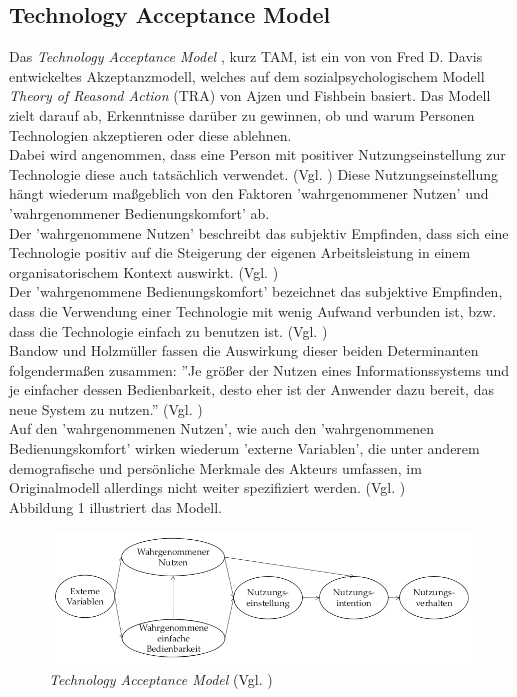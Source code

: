 \documentclass[deutsch]{lib/llncs/llncs}
\begin{document}
\subsection{Technology Acceptance Model}
Das \textit{Technology Acceptance Model} \cite{Zitat01}, kurz TAM, ist ein von von Fred D. Davis entwickeltes Akzeptanzmodell, welches auf dem sozialpsychologischem Modell \textit{Theory of Reasond Action} (TRA) von Ajzen und Fishbein \cite{Zitat04} basiert. Das Modell zielt darauf ab, Erkenntnisse darüber zu gewinnen, ob und warum Personen Technologien akzeptieren oder diese ablehnen. \\
Dabei wird angenommen, dass eine Person mit positiver Nutzungseinstellung zur Technologie diese auch tatsächlich verwendet. (Vgl. \cite[S. 237]{Zitat03}) Diese Nutzungseinstellung hängt wiederum maßgeblich von den Faktoren 'wahrgenommener Nutzen' und 'wahrgenommener Bedienungskomfort' ab. \\
Der 'wahrgenommene Nutzen' beschreibt das subjektiv Empfinden, dass sich eine Technologie positiv auf die Steigerung der eigenen Arbeitsleistung in einem organisatorischem Kontext auswirkt.  (Vgl. \cite[S. 320]{Zitat02}) \\
Der 'wahrgenommene Bedienungskomfort' bezeichnet das subjektive Empfinden, dass die Verwendung einer Technologie mit wenig Aufwand verbunden ist, bzw. dass die Technologie einfach zu benutzen ist. (Vgl. \cite[S. 320]{Zitat02}) \\
Bandow und Holzmüller fassen die Auswirkung dieser beiden Determinanten folgendermaßen zusammen: ''Je größer der Nutzen eines Informationssystems und je einfacher dessen Bedienbarkeit, desto eher ist der Anwender dazu bereit, das neue System zu nutzen.'' (Vgl. \cite[S. 237]{Zitat03}) \\
Auf den 'wahrgenommenen Nutzen', wie auch den 'wahrgenommenen Bedienungskomfort' wirken wiederum 'externe Variablen', die unter anderem demografische und persönliche Merkmale des Akteurs umfassen, im Originalmodell allerdings nicht weiter spezifiziert werden. (Vgl. \cite[S. 21]{Zitat01}) \\
Abbildung 1 illustriert das Modell.
\begin{figure}
	\centering
	\includegraphics[scale=0.40]{img/abbildung1.png}
	\caption{\textit{Technology Acceptance Model} (Vgl. \cite[S. 237]{Zitat03})}
\end{figure}
\end{document}
